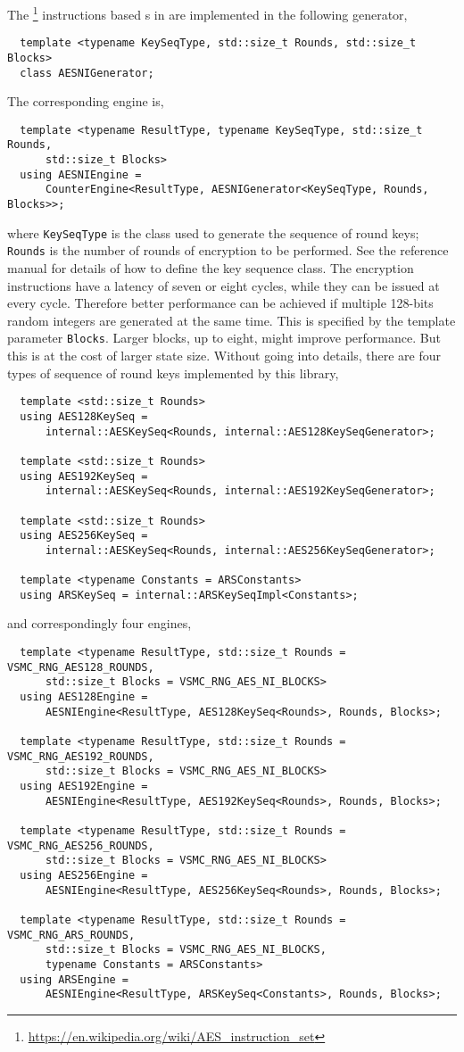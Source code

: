 The \aesni\footnote{\url{https://en.wikipedia.org/wiki/AES_instruction_set}}
instructions based \rng{}s in \textcite{Salmon:2011um} are implemented in the
following generator,
\begin{Verbatim}
  template <typename KeySeqType, std::size_t Rounds, std::size_t Blocks>
  class AESNIGenerator;
\end{Verbatim}
The corresponding \rng engine is,
\begin{Verbatim}
  template <typename ResultType, typename KeySeqType, std::size_t Rounds,
      std::size_t Blocks>
  using AESNIEngine =
      CounterEngine<ResultType, AESNIGenerator<KeySeqType, Rounds, Blocks>>;
\end{Verbatim}
where \verb|KeySeqType| is the class used to generate the sequence of round
keys; \verb|Rounds| is the number of rounds of \aes encryption to be performed.
See the reference manual for details of how to define the key sequence class.
The \aesni encryption instructions have a latency of seven or eight cycles,
while they can be issued at every cycle. Therefore better performance can be
achieved if multiple 128-bits random integers are generated at the same time.
This is specified by the template parameter \verb|Blocks|. Larger blocks, up to
eight, might improve performance. But this is at the cost of larger state size.
Without going into details, there are four types of sequence of round keys
implemented by this library,
\begin{Verbatim}
  template <std::size_t Rounds>
  using AES128KeySeq =
      internal::AESKeySeq<Rounds, internal::AES128KeySeqGenerator>;

  template <std::size_t Rounds>
  using AES192KeySeq =
      internal::AESKeySeq<Rounds, internal::AES192KeySeqGenerator>;

  template <std::size_t Rounds>
  using AES256KeySeq =
      internal::AESKeySeq<Rounds, internal::AES256KeySeqGenerator>;

  template <typename Constants = ARSConstants>
  using ARSKeySeq = internal::ARSKeySeqImpl<Constants>;
\end{Verbatim}
and correspondingly four \rng engines,
\begin{Verbatim}
  template <typename ResultType, std::size_t Rounds = VSMC_RNG_AES128_ROUNDS,
      std::size_t Blocks = VSMC_RNG_AES_NI_BLOCKS>
  using AES128Engine =
      AESNIEngine<ResultType, AES128KeySeq<Rounds>, Rounds, Blocks>;

  template <typename ResultType, std::size_t Rounds = VSMC_RNG_AES192_ROUNDS,
      std::size_t Blocks = VSMC_RNG_AES_NI_BLOCKS>
  using AES192Engine =
      AESNIEngine<ResultType, AES192KeySeq<Rounds>, Rounds, Blocks>;

  template <typename ResultType, std::size_t Rounds = VSMC_RNG_AES256_ROUNDS,
      std::size_t Blocks = VSMC_RNG_AES_NI_BLOCKS>
  using AES256Engine =
      AESNIEngine<ResultType, AES256KeySeq<Rounds>, Rounds, Blocks>;

  template <typename ResultType, std::size_t Rounds = VSMC_RNG_ARS_ROUNDS,
      std::size_t Blocks = VSMC_RNG_AES_NI_BLOCKS,
      typename Constants = ARSConstants>
  using ARSEngine =
      AESNIEngine<ResultType, ARSKeySeq<Constants>, Rounds, Blocks>;
\end{Verbatim}
